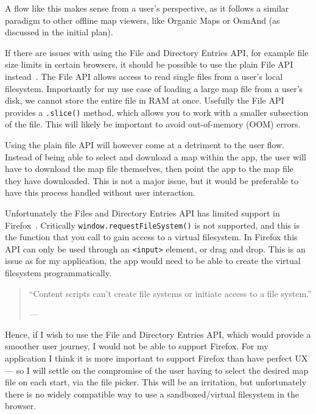 A flow like this makes sense from a user's perspective, as it follows a similar paradigm to other offline map viewers, like Organic Maps or OsmAnd (as discussed in the initial plan).

If there are issues with using the File and Directory Entries API, for example file size limits in certain browsers, it should be possible to use the plain File API instead~\cite{w3c-file-api}. The File API allows access to read single files from a user's local filesystem. Importantly for my use case of loading a large map file from a user's disk, we cannot store the entire file in RAM at once. Usefully the File API provides a \texttt{.slice()} method, which allows you to work with a smaller subsection of the file. This will likely be important to avoid out-of-memory (OOM) errors.

Using the plain file API will however come at a detriment to the user flow. Instead of being able to select and download a map within the app, the user will have to download the map file themselves, then point the app to the map file they have downloaded. This is not a major issue, but it would be preferable to have this process handled without user interaction.

Unfortunately the Files and Directory Entries API has limited support in Firefox~\cite{mdn-file-directories-api-limitations}. Critically \texttt{window.requestFileSystem()} is not supported, and this is the function that you call to gain access to a virtual filesystem. In Firefox this API can only be used through an \texttt{<input>} element, or drag and drop. This is an issue as for my application, the app would need to be able to create the virtual filesystem programmatically.

\begin{quote}
    ``Content scripts can't create file systems or initiate access to a file system.''

    \footnotesize{--- }
\end{quote}

Hence, if I wish to use the File and Directory Entries API, which would provide a smoother user journey, I would not be able to support Firefox. For my application I think it is more important to support Firefox than have perfect UX --- so I will settle on the compromise of the user having to select the desired map file on each start, via the file picker. This will be an irritation, but unfortunately there is no widely compatible way to use a sandboxed/virtual filesystem in the browser.

